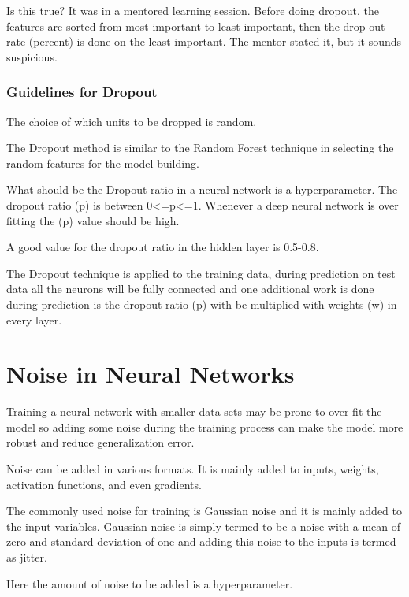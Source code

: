 Is this true?  It was in a mentored learning session.
Before doing dropout, the features are sorted from most important to least important, then the drop out rate (percent) is done on the least important.  The mentor stated it, but it sounds suspicious.

	\subsubsection{Guidelines for Dropout}
	\begin{bulletedlist}
		\item The choice of which units to be dropped is random.
		\item The Dropout method is similar to the Random Forest technique in selecting the random features for the model building.
		\item What should be the Dropout ratio in a neural network is a hyperparameter. The dropout ratio (p) is between 0<=p<=1. Whenever a deep neural network is over fitting the (p) value should be high.
		\item A good value for the dropout ratio in the hidden layer is 0.5-0.8.
		\item The Dropout technique is applied to the training data, during prediction on test data all the neurons will be fully connected and one additional work is done during prediction is the dropout ratio (p) with be multiplied with weights (w) in every layer.
	\end{bulletedlist}

	\section{Noise in Neural Networks}
	\begin{bulletedlist}
		\item Training a neural network with smaller data sets may be prone to over fit the model so adding some noise during the training process can make the model more robust and reduce generalization error.
		\item Noise can be added in various formats. It is mainly added to inputs, weights, activation functions, and even gradients.
		\item The commonly used noise for training is Gaussian noise and it is mainly added to the input variables. Gaussian noise is simply termed to be a noise with a mean of zero and standard deviation of one and adding this noise to the inputs is termed as jitter.
		\item Here the amount of noise to be added is a hyperparameter.
	\end{bulletedlist}


